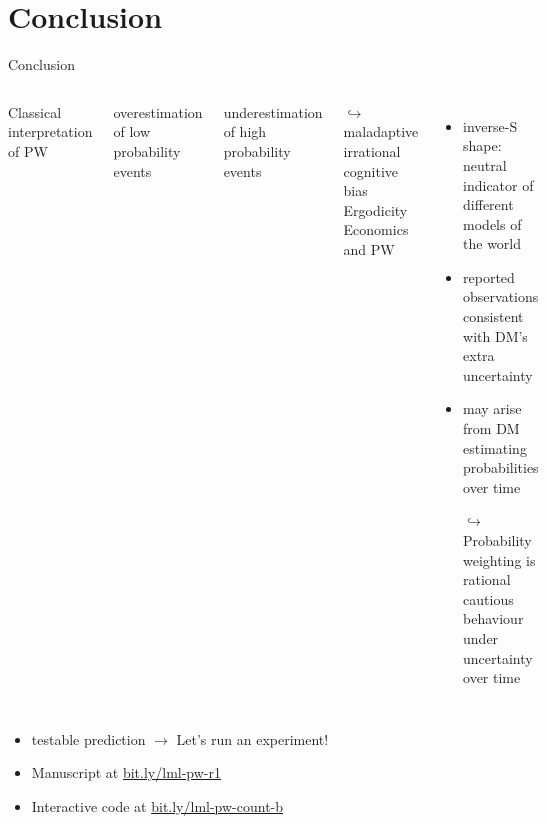 \section{Conclusion}
\begin{frame}{Conclusion}
\begin{columns}[T]
Classical interpretation of PW
\bi
  \item overestimation of low probability events
  \item underestimation of high probability events
	\item[$\hookrightarrow$]	maladaptive irrational cognitive bias
\ei
{}
Ergodicity Economics and PW
\begin{itemize}
  \item inverse-S shape: neutral indicator of different models of the world
	\item reported observations consistent with DM's extra uncertainty
	\item may arise from DM estimating probabilities over time
  \item[$\hookrightarrow$] Probability weighting is rational cautious behaviour under uncertainty over time
\end{itemize}
\end{columns}
\vfill
\begin{itemize}
  \item testable prediction $\to$ Let's run an experiment!
  \item Manuscript at \url{bit.ly/lml-pw-r1}
  \item Interactive code at \url{bit.ly/lml-pw-count-b}    
\end{itemize}


\end{frame}
